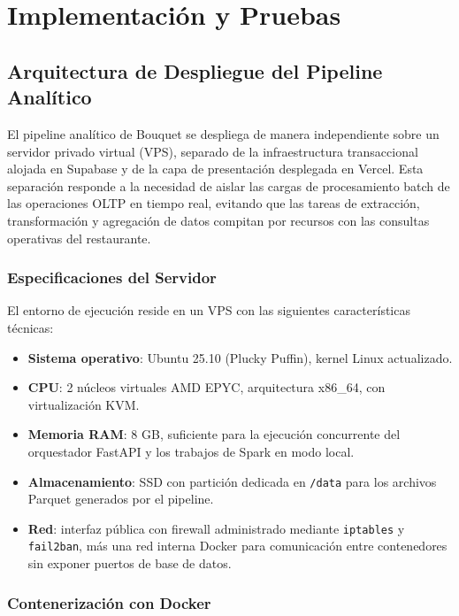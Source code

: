 \section{Implementación y Pruebas}

\subsection{Arquitectura de Despliegue del Pipeline Analítico}

El pipeline analítico de Bouquet se despliega de manera independiente sobre un
servidor privado virtual (VPS), separado de la infraestructura transaccional
alojada en Supabase y de la capa de presentación desplegada en Vercel. Esta
separación responde a la necesidad de aislar las cargas de procesamiento batch
de las operaciones OLTP en tiempo real, evitando que las tareas de extracción,
transformación y agregación de datos compitan por recursos con las consultas
operativas del restaurante.

\subsubsection{Especificaciones del Servidor}

El entorno de ejecución reside en un VPS con las siguientes características
técnicas:

\begin{itemize}[leftmargin=1.5em]
  \item \textbf{Sistema operativo}: Ubuntu 25.10 (Plucky Puffin), kernel Linux
  actualizado.
  \item \textbf{CPU}: 2 núcleos virtuales AMD EPYC, arquitectura x86\_64, con
  virtualización KVM.
  \item \textbf{Memoria RAM}: 8 GB, suficiente para la ejecución concurrente del
  orquestador FastAPI y los trabajos de Spark en modo local.
  \item \textbf{Almacenamiento}: SSD con partición dedicada en \texttt{/data} para
  los archivos Parquet generados por el pipeline.
  \item \textbf{Red}: interfaz pública con firewall administrado mediante
  \texttt{iptables} y \texttt{fail2ban}, más una red interna Docker para
  comunicación entre contenedores sin exponer puertos de base de datos.
\end{itemize}

\subsubsection{Contenerización con Docker}

